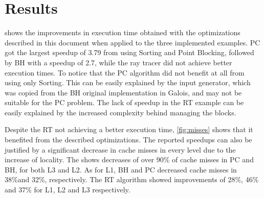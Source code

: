 \section{Results}
\label{sec:results}



 shows the improvements in execution time obtained with the optimizations described in this document when applied to the three implemented examples. PC got the largest speedup of 3.79 from using Sorting and Point Blocking, followed by BH with a speedup of 2.7, while the ray tracer did not achieve better execution times. To notice that the PC algorithm did not benefit at all from using only Sorting. This can be easily explained by the input generator, which was copied from the BH original implementation in Galois, and may not be suitable for the PC problem. The lack of speedup in the RT example can be easily explained by the increased complexity behind managing the blocks.





Despite the RT not achieving a better execution time, \cref{fig:misses} shows that it benefited from the described optimizations. The reported speedups can also be justified by a significant decrease in cache misses in every level due to the increase of locality. The  shows decreases of over 90\% of cache misses in PC and BH, for both L3 and L2. As for L1, BH and PC decreased cache misses in 38\%and 32\%, respectively. The RT algorithm showed improvements of 28\%, 46\% and 37\% for L1, L2 and L3 respectively.